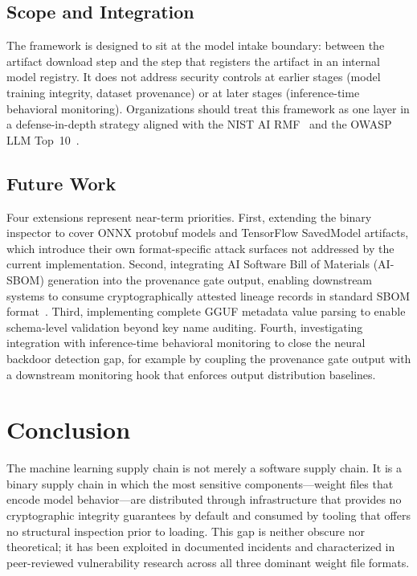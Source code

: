 \documentclass[sigconf,review]{acmart}
\begin{document}
\subsection{Scope and Integration}

The framework is designed to sit at the model intake boundary: between the
artifact download step and the step that registers the artifact in an
internal model registry. It does not address security controls at earlier
stages (model training integrity, dataset provenance) or at later stages
(inference-time behavioral monitoring). Organizations should treat this
framework as one layer in a defense-in-depth strategy aligned with the NIST
AI RMF~\cite{nist_ai_rmf2023} and the OWASP LLM Top~10~\cite{owasp_llm_supply2025}.

\subsection{Future Work}

Four extensions represent near-term priorities. First, extending the binary
inspector to cover ONNX protobuf models and TensorFlow SavedModel artifacts,
which introduce their own format-specific attack surfaces not addressed by
the current implementation. Second, integrating AI Software Bill of
Materials (AI-SBOM) generation into the provenance gate output, enabling
downstream systems to consume cryptographically attested lineage records in
standard SBOM format~\cite{gentyala2026aisbom,frontiers2026aibom}. Third,
implementing complete GGUF metadata value parsing to enable schema-level
validation beyond key name auditing. Fourth, investigating integration with
inference-time behavioral monitoring to close the neural backdoor detection
gap, for example by coupling the provenance gate output with a downstream
monitoring hook that enforces output distribution baselines.

\section{Conclusion}
\label{sec:conclusion}

The machine learning supply chain is not merely a software supply chain. It
is a binary supply chain in which the most sensitive components---weight
files that encode model behavior---are distributed through infrastructure
that provides no cryptographic integrity guarantees by default and consumed
by tooling that offers no structural inspection prior to loading. This gap
is neither obscure nor theoretical; it has been exploited in documented
incidents and characterized in peer-reviewed vulnerability research across
all three dominant weight file formats.
\end{document}
